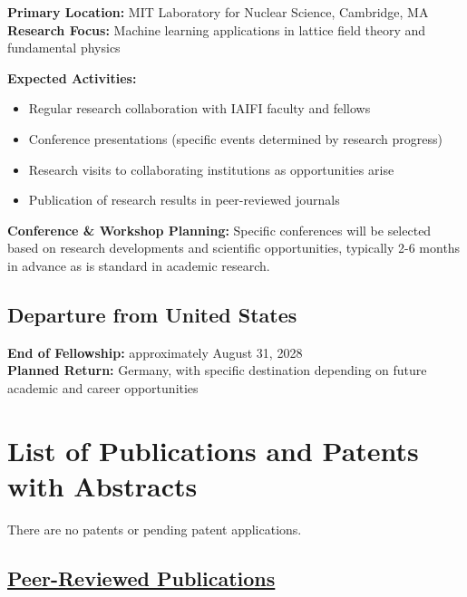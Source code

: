 \documentclass[11pt]{article}
\newcommand{\currentsection}{}
\newcommand{\sectionwithheader}[1]{
    \section{#1}
    \renewcommand{\currentsection}{\thesection. #1}
}
\begin{document}
\textbf{Primary Location:} MIT Laboratory for Nuclear Science, Cambridge, MA\\
\textbf{Research Focus:} Machine learning applications in lattice field theory and fundamental physics

\textbf{Expected Activities:}
\begin{itemize}[noitemsep]
\item Regular research collaboration with IAIFI faculty and fellows
\item Conference presentations (specific events determined by research progress)
\item Research visits to collaborating institutions as opportunities arise
\item Publication of research results in peer-reviewed journals
\end{itemize}

\textbf{Conference \& Workshop Planning:} Specific conferences will be selected based on research developments and scientific opportunities, typically 2-6 months in advance as is standard in academic research.

\subsection*{Departure from United States}
\textbf{End of Fellowship:} approximately August 31, 2028\\
\textbf{Planned Return:} Germany, with specific destination depending on future academic and career opportunities

\newpage

\sectionwithheader{List of Publications and Patents with Abstracts}

There are no patents or pending patent applications.

\subsection*{\underline{Peer-Reviewed Publications}}
\end{document}

